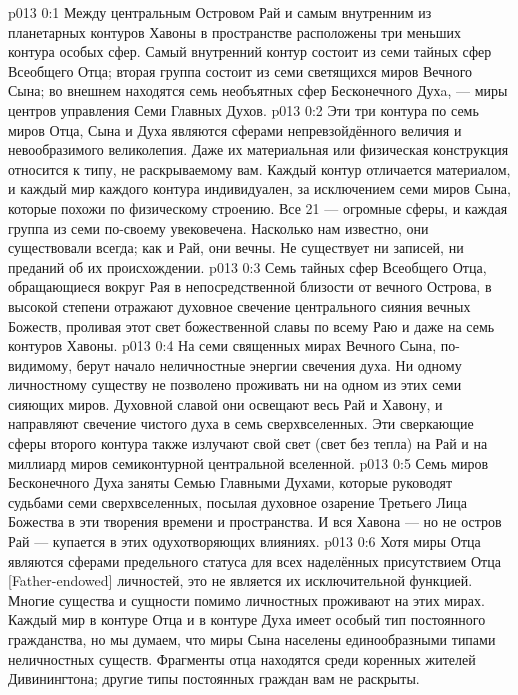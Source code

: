 \author{Совершенствователь Мудрости}
\vs p013 0:1 Между центральным Островом Рай и самым внутренним из планетарных контуров Хавоны в пространстве расположены три меньших контура особых сфер. Самый внутренний контур состоит из семи тайных сфер Всеобщего Отца; вторая группа состоит из семи светящихся миров Вечного Сына; во внешнем находятся семь необъятных сфер Бесконечного Духa, --- миры центров управления Семи Главных Духов.
\vs p013 0:2 Эти три контура по семь миров Отца, Сына и Духа являются сферами непревзойдённого величия и невообразимого великолепия. Даже их материальная или физическая конструкция относится к типу, не раскрываемому вам. Каждый контур отличается материалом, и каждый мир каждого контура индивидуален, за исключением семи миров Сына, которые похожи по физическому строению. Все 21 --- огромные сферы, и каждая группа из семи по\hyp{}своему увековечена. Насколько нам известно, они существовали всегда; как и Рай, они вечны. Не существует ни записей, ни преданий об их происхождении.
\vs p013 0:3 \pc Семь тайных сфер Всеобщего Отца, обращающиеся вокруг Рая в непосредственной близости от вечного Острова, в высокой степени отражают духовное свечение центрального сияния вечных Божеств, проливая этот свет божественной славы по всему Раю и даже на семь контуров Хавоны.
\vs p013 0:4 \pc На семи священных мирах Вечного Сына, по\hyp{}видимому, берут начало неличностные энергии свечения духа. Ни одному личностному существу не позволено проживать ни на одном из этих семи сияющих миров. Духовной славой они освещают весь Рай и Хавону, и направляют свечение чистого духа в семь сверхвселенных. Эти сверкающие сферы второго контура также излучают свой свет (свет без тепла) на Рай и на миллиард миров семиконтурной центральной вселенной.
\vs p013 0:5 \pc Семь миров Бесконечного Духа заняты Семью Главными Духами, которые руководят судьбами семи сверхвселенных, посылая духовное озарение Третьего Лица Божества в эти творения времени и пространства. И вся Хавона --- но не остров Рай --- купается в этих одухотворяющих влияниях.
\vs p013 0:6 \pc Хотя миры Отца являются сферами предельного статуса для всех наделённых присутствием Отца [Father\hyp{}endowed] личностей, это не является их исключительной функцией. Многие существа и сущности помимо личностных проживают на этих мирах. Каждый мир в контуре Отца и в контуре Духа имеет особый тип постоянного гражданства, но мы думаем, что миры Сына населены единообразными типами неличностных существ. Фрагменты отца находятся среди коренных жителей Дивинингтона; другие типы постоянных граждан вам не раскрыты.
